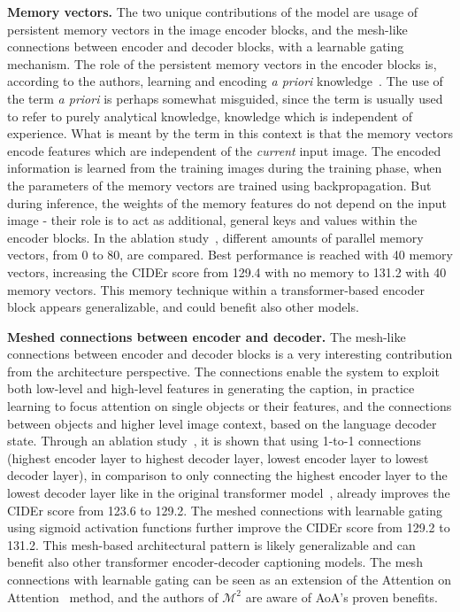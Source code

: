 \documentclass[english,twoside,openright]{HYgraduMLDS}
\begin{document}
\textbf{Memory vectors.} The two unique contributions of the model are usage of persistent memory vectors in the image encoder blocks, and the mesh-like connections between encoder and decoder blocks, with a learnable gating mechanism. The role of the persistent memory vectors in the encoder blocks is, according to the authors, learning and encoding \textit{a priori} knowledge~\cite{M2}. The use of the term \textit{a priori} is perhaps somewhat misguided, since the term is usually used to refer to purely analytical knowledge, knowledge which is independent of experience. What is meant by the term in this context is that the memory vectors encode features which are independent of the \textit{current} input image. The encoded information is learned from the training images during the training phase, when the parameters of the memory vectors are trained using backpropagation. But during inference, the weights of the memory features do not depend on the input image - their role is to act as additional, general keys and values within the encoder blocks. In the ablation study~\cite{M2supplement}, different amounts of parallel memory vectors, from 0 to 80, are compared. Best performance is reached with 40 memory vectors, increasing the CIDEr score from 129.4 with no memory to 131.2 with 40 memory vectors. This memory technique within a transformer-based encoder block appears generalizable, and could benefit also other models. 

\textbf{Meshed connections between encoder and decoder.} The mesh-like connections between encoder and decoder blocks is a very interesting contribution from the architecture perspective. The connections enable the system to exploit both low-level and high-level features in generating the caption, in practice learning to focus attention on single objects or their features, and the connections between objects and higher level image context, based on the language decoder state. Through an ablation study~\cite{M2}, it is shown that using 1-to-1 connections (highest encoder layer to highest decoder layer, lowest encoder layer to lowest decoder layer), in comparison to only connecting the highest encoder layer to the lowest decoder layer like in the original transformer model~\cite{Attention}, already improves the CIDEr score from 123.6 to 129.2. The meshed connections with learnable gating using sigmoid activation functions further improve the CIDEr score from 129.2 to 131.2. This mesh-based architectural pattern is likely generalizable and can benefit also other transformer encoder-decoder captioning models. The mesh connections with learnable gating can be seen as an extension of the Attention on Attention~\cite{AoA} method, and the authors of $\mathcal{M}^2$ are aware of AoA's proven benefits.
\end{document}
